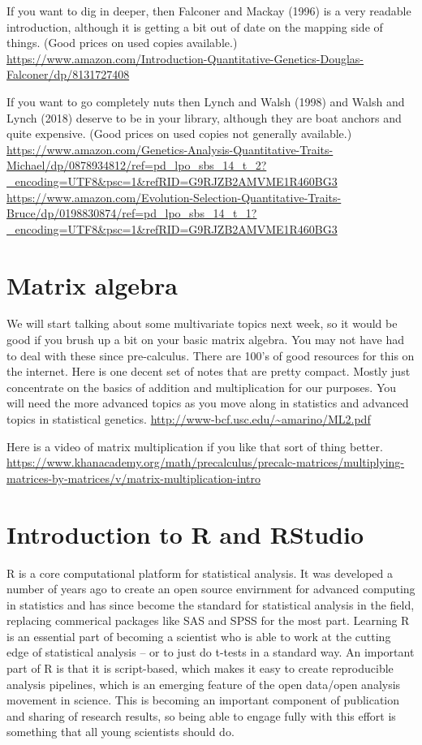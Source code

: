 \documentclass[]{book}
\begin{document}
If you want to dig in deeper, then Falconer and Mackay (1996) is a very readable introduction, although it is getting a bit out of date on the mapping side of things. (Good prices on used copies available.)
\url{https://www.amazon.com/Introduction-Quantitative-Genetics-Douglas-Falconer/dp/8131727408}

If you want to go completely nuts then Lynch and Walsh (1998) and Walsh and Lynch (2018) deserve to be in your library, although they are boat anchors and quite expensive. (Good prices on used copies not generally available.)
\url{https://www.amazon.com/Genetics-Analysis-Quantitative-Traits-Michael/dp/0878934812/ref=pd_lpo_sbs_14_t_2?_encoding=UTF8\&psc=1\&refRID=G9RJZB2AMVME1R460BG3}
\url{https://www.amazon.com/Evolution-Selection-Quantitative-Traits-Bruce/dp/0198830874/ref=pd_lpo_sbs_14_t_1?_encoding=UTF8\&psc=1\&refRID=G9RJZB2AMVME1R460BG3}

\hypertarget{matrix-algebra}{%
\section{Matrix algebra}\label{matrix-algebra}}

We will start talking about some multivariate topics next week, so it would be good if you brush up a bit on your basic matrix algebra. You may not have had to deal with these since pre-calculus. There are 100's of good resources for this on the internet. Here is one decent set of notes that are pretty compact. Mostly just concentrate on the basics of addition and multiplication for our purposes. You will need the more advanced topics as you move along in statistics and advanced topics in statistical genetics.
\url{http://www-bcf.usc.edu/~amarino/ML2.pdf}

Here is a video of matrix multiplication if you like that sort of thing better.
\url{https://www.khanacademy.org/math/precalculus/precalc-matrices/multiplying-matrices-by-matrices/v/matrix-multiplication-intro}

\hypertarget{introduction-to-r-and-rstudio}{%
\section{Introduction to R and RStudio}\label{introduction-to-r-and-rstudio}}

R is a core computational platform for statistical analysis. It was developed a number of years ago to create an open source envirnment for advanced computing in statistics and has since become the standard for statistical analysis in the field, replacing commerical packages like SAS and SPSS for the most part. Learning R is an essential part of becoming a scientist who is able to work at the cutting edge of statistical analysis -- or to just do t-tests in a standard way. An important part of R is that it is script-based, which makes it easy to create reproducible analysis pipelines, which is an emerging feature of the open data/open analysis movement in science. This is becoming an important component of publication and sharing of research results, so being able to engage fully with this effort is something that all young scientists should do.
\end{document}
